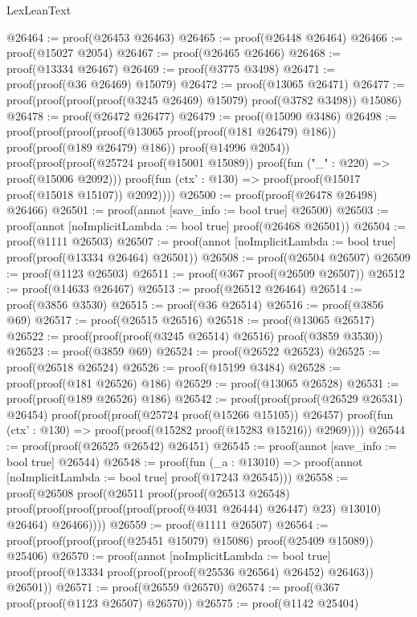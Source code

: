 \begin{lexlean}{LexLeanText}
\begin{coremodule}
@26464 := proof(@26453 @26463)
@26465 := proof(@26448 @26464)
@26466 := proof(@15027 @2054)
@26467 := proof(@26465 @26466)
@26468 := proof(@13334 @26467)
@26469 := proof(@3775 @3498)
@26471 := proof(proof(@36 @26469) @15079)
@26472 := proof(@13065 @26471)
@26477 := proof(proof(proof(proof(@3245 @26469) @15079) proof(@3782 @3498)) @15086)
@26478 := proof(@26472 @26477)
@26479 := proof(@15090 @3486)
@26498 := proof(proof(proof(proof(@13065 proof(proof(@181 @26479) @186))
          proof(proof(@189 @26479) @186))
        proof(@14996 @2054))
      proof(proof(proof(@25724 proof(@15001 @15089)) proof(fun ("_" : @220) => proof(@15006 @2092)))
          proof(fun (ctx' : @130) => proof(proof(@15017 proof(@15018 @15107)) @2092))))
@26500 := proof(proof(@26478 @26498) @26466)
@26501 := proof(annot [save_info := bool true] @26500)
@26503 := proof(annot [noImplicitLambda := bool true] proof(@26468 @26501))
@26504 := proof(@1111 @26503)
@26507 := proof(annot [noImplicitLambda := bool true] proof(proof(@13334 @26464) @26501))
@26508 := proof(@26504 @26507)
@26509 := proof(@1123 @26503)
@26511 := proof(@367 proof(@26509 @26507))
@26512 := proof(@14633 @26467)
@26513 := proof(@26512 @26464)
@26514 := proof(@3856 @3530)
@26515 := proof(@36 @26514)
@26516 := proof(@3856 @69)
@26517 := proof(@26515 @26516)
@26518 := proof(@13065 @26517)
@26522 := proof(proof(proof(@3245 @26514) @26516) proof(@3859 @3530))
@26523 := proof(@3859 @69)
@26524 := proof(@26522 @26523)
@26525 := proof(@26518 @26524)
@26526 := proof(@15199 @3484)
@26528 := proof(proof(@181 @26526) @186)
@26529 := proof(@13065 @26528)
@26531 := proof(proof(@189 @26526) @186)
@26542 := proof(proof(proof(@26529 @26531) @26454)
      proof(proof(proof(@25724 proof(@15266 @15105)) @26457)
          proof(fun (ctx' : @130) => proof(proof(@15282 proof(@15283 @15216)) @2969))))
@26544 := proof(proof(@26525 @26542) @26451)
@26545 := proof(annot [save_info := bool true] @26544)
@26548 := proof(fun (_a : @13010) =>
    proof(annot [noImplicitLambda := bool true] proof(@17243 @26545)))
@26558 := proof(@26508
      proof(@26511
          proof(proof(@26513 @26548)
              proof(proof(proof(proof(proof(proof(@4031 @26444) @26447) @23) @13010) @26464)
                  @26466))))
@26559 := proof(@1111 @26507)
@26564 := proof(proof(proof(proof(@25451 @15079) @15086) proof(@25409 @15089)) @25406)
@26570 := proof(annot [noImplicitLambda := bool true]
    proof(proof(@13334 proof(proof(proof(@25536 @26564) @26452) @26463)) @26501))
@26571 := proof(@26559 @26570)
@26574 := proof(@367 proof(proof(@1123 @26507) @26570))
@26575 := proof(@1142 @25404)

\end{coremodule}
\end{lexlean}
